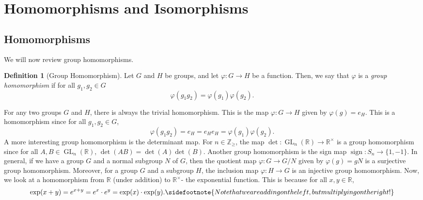 \documentclass[a4paper, openany]{memoir}
\theoremstyle{definition}
\newtheorem{definition}{Definition}[section]
\theoremstyle{plain}
\begin{document}
\newpage

\section{Homomorphisms and Isomorphisms}
\subsection{Homomorphisms}
We will now review group homomorphisms.
\begin{definition}[Group Homomorphism]
Let $G$ and $H$ be groups, and let $\varphi: G \to H$ be a function. Then, we say that $\varphi$ is a \emph{group homomorphism} if for all $g_1, g_2 \in G$
\[\varphi(g_1 g_2) = \varphi(g_1) \varphi(g_2).\]
\end{definition}
\noindent For any two groups $G$ and $H$, there is always the trivial homomorphism. This is the map $\varphi: G \to H$ given by $\varphi(g) = e_H$. This is a homomorphism since for all $g_1, g_2 \in G$,
\[\varphi(g_1 g_2) = e_H = e_H e_H = \varphi(g_1) \varphi(g_2).\]
A more interesting group homomorphism is the determinant map. For $n \in \mathbb{Z}_{\geqslant}$, the map $\det: \operatorname{GL}_n(\mathbb{R}) \to \mathbb{R}^\times$ is a group homomorphism since for all $A, B \in \operatorname{GL}_n(\mathbb{R})$, $\det(AB) = \det(A) \det(B)$. Another group homomorphism is the sign map $\operatorname{sign}: S_n \to \{1, -1\}$. In general, if we have a group $G$ and a normal subgroup $N$ of $G$, then the quotient map $\varphi: G \to G/N$ given by $\varphi(g) = gN$ is a surjective group homomorphism. Moreover, for a group $G$ and a subgroup $H$, the inclusion map $\varphi: H \to G$ is an injective group homomorphism. Now, we look at a homomorphism from $\mathbb{R}$ (under addition) to $\mathbb{R}^{\times}$- the exponential function. This is because for all $x, y \in \mathbb{R}$,
\[\exp(x + y) = e^{x + y} = e^x \cdot e^y = \exp(x) \cdot \exp(y).\sidefootnote{Note that we are adding on the left, but multiplying on the right!}\]
\end{document}
